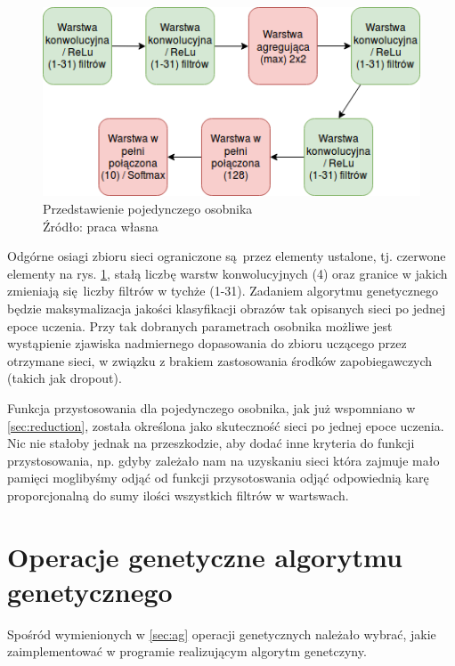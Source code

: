 \begin{figure}[h!tb]
	 \centering
	 \includegraphics[width = 1.0\linewidth]{img/fenotyp}
	 \caption{Przedstawienie pojedynczego osobnika \\
              Źródło: praca własna}
	 \label{fig:fenotyp}
\end{figure}

Odgórne osiagi zbioru sieci ograniczone są przez elementy ustalone, tj. czerwone elementy na rys. \ref{fig:fenotyp}, stałą liczbę warstw konwolucyjnych (4) oraz granice w jakich zmieniają się liczby filtrów w tychże (1-31).
Zadaniem algorytmu genetycznego będzie maksymalizacja jakości klasyfikacji obrazów tak opisanych sieci po jednej epoce uczenia.
Przy tak dobranych parametrach osobnika możliwe jest wystąpienie zjawiska nadmiernego dopasowania do zbioru uczącego przez otrzymane sieci, w związku z brakiem zastosowania środków zapobiegawczych (takich jak dropout).

Funkcja przystosowania dla pojedynczego osobnika, jak już wspomniano w \ref{sec:reduction}, została określona jako skuteczność sieci po jednej epoce uczenia.
Nic nie stałoby jednak na przeszkodzie, aby dodać inne kryteria do funkcji przystosowania, np. gdyby zależało nam na uzyskaniu sieci która zajmuje mało pamięci moglibyśmy odjąć od funkcji przysotoswania odjąć odpowiednią karę proporcjonalną do sumy ilości wszystkich filtrów w wartswach.

\section{Operacje genetyczne algorytmu genetycznego}\label{sec:genetic_ops}
Spośród wymienionych w \ref{sec:ag} operacji genetycznych należało wybrać, jakie zaimplementować w programie realizującym algorytm genetczyny.
